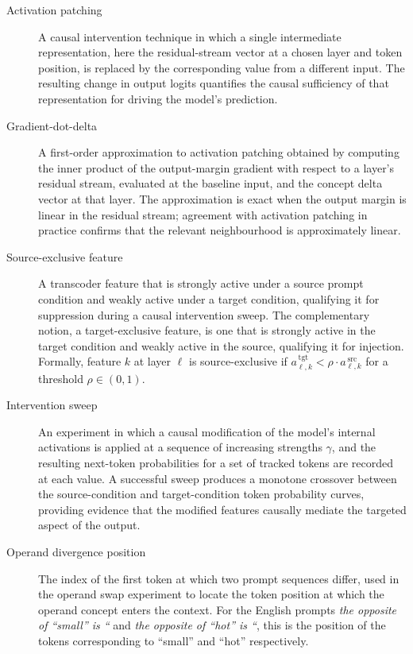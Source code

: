 \begin{description}
  \item[Activation patching] A causal intervention technique in which a single intermediate
    representation, here the residual-stream vector at a chosen layer and token position,
    is replaced by the corresponding value from a different input.
    The resulting change in output logits quantifies the causal sufficiency of that
    representation for driving the model's prediction.

  \item[Gradient-dot-delta] A first-order approximation to activation patching obtained by
    computing the inner product of the output-margin gradient with respect to a layer's
    residual stream, evaluated at the baseline input, and the concept delta vector at that layer.
    The approximation is exact when the output margin is linear in the residual stream;
    agreement with activation patching in practice confirms that the relevant neighbourhood
    is approximately linear.

  \item[Source-exclusive feature] A transcoder feature that is strongly active under a source
    prompt condition and weakly active under a target condition, qualifying it for suppression
    during a causal intervention sweep.  The complementary notion, a target-exclusive feature,
    is one that is strongly active in the target condition and weakly active in the source,
    qualifying it for injection.  Formally, feature $k$ at layer $\ell$ is source-exclusive if
    $a_{\ell,k}^{\,\mathrm{tgt}} < \rho\cdot a_{\ell,k}^{\,\mathrm{src}}$ for a
    threshold $\rho \in (0,1)$.

  \item[Intervention sweep] An experiment in which a causal modification of the model's
    internal activations is applied at a sequence of increasing strengths $\gamma$, and the
    resulting next-token probabilities for a set of tracked tokens are recorded at each value.
    A successful sweep produces a monotone crossover between the source-condition and
    target-condition token probability curves, providing evidence that the modified features
    causally mediate the targeted aspect of the output.

  \item[Operand divergence position] The index of the first token at which two prompt
    sequences differ, used in the operand swap experiment to locate the token position at
    which the operand concept enters the context.  For the English prompts \textit{the opposite
    of ``small'' is ``} and \textit{the opposite of ``hot'' is ``}, this is the position of
    the tokens corresponding to ``small'' and ``hot'' respectively.

\end{description}
